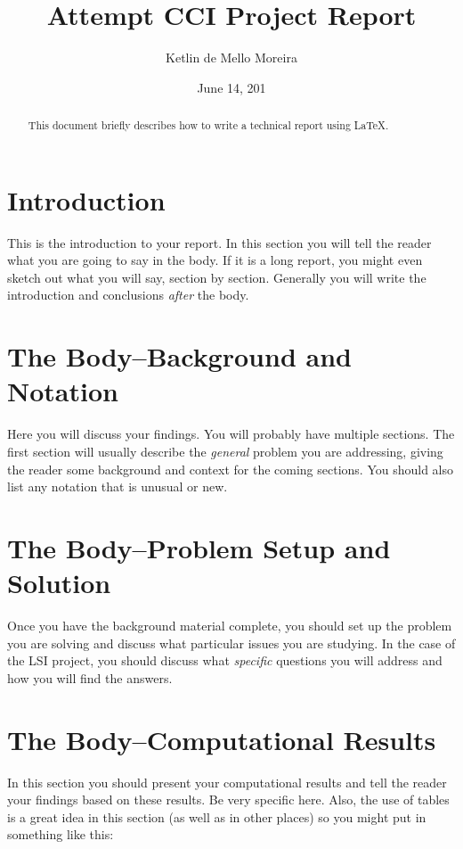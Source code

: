 \documentclass{IEEEtran}
\title{Attempt CCI Project Report}
\author{Ketlin de Mello Moreira}
\date{June 14, 201}
\begin{document}

\maketitle
\pagestyle{plain}

\begin{abstract}
This document briefly describes how to write a technical report using \LaTeX.
\end{abstract}

\section{Introduction}

This is the introduction to your report.  In this section you will tell the reader what you are going to say in the body.  If it is a long report, you might even sketch out what you will say, section by section.  Generally you will write the introduction and conclusions {\it after} the body.

\section{The Body--Background and Notation}
Here you will discuss your findings.  You will probably have multiple sections.  The first section will usually describe the {\it general} problem you are addressing, giving the reader some background and context for the coming sections.  You should also list any notation that is unusual or new.

\section{The Body--Problem Setup and Solution}

Once you have the background material complete, you should set up the problem you are solving and discuss what particular issues you are studying.  In the case of the LSI project, you should discuss what { \it specific } questions you will address and how you will find the answers.




\section{The Body--Computational Results}

In this section you should present your computational results and tell the reader your findings based on these results.  Be very specific here.  Also, the use of tables is a great idea in this section (as well as in other places) so you might put in something like this:
\end{document}
